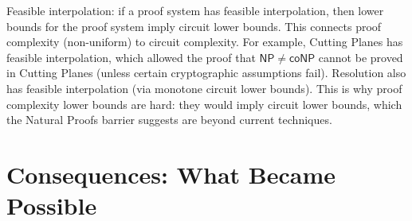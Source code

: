 \begin{remark}
Feasible interpolation: if a proof system has feasible interpolation, then lower bounds for the proof system imply circuit lower bounds. This connects proof complexity (non-uniform) to circuit complexity. For example, Cutting Planes has feasible interpolation, which allowed the proof that $\mathsf{NP} \neq \mathsf{coNP}$ cannot be proved in Cutting Planes (unless certain cryptographic assumptions fail). Resolution also has feasible interpolation (via monotone circuit lower bounds). This is why proof complexity lower bounds are hard: they would imply circuit lower bounds, which the Natural Proofs barrier suggests are beyond current techniques.
\end{remark}

\section{Consequences: What Became Possible}
\label{sec:complexity:consequences}

